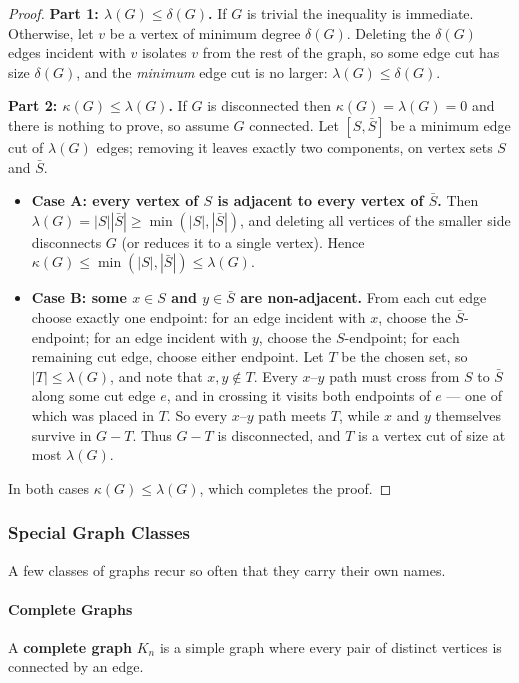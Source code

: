 \begin{proof}
\textbf{Part 1: $\lambda(G) \le \delta(G)$.}
If $G$ is trivial the inequality is immediate. Otherwise, let $v$ be a vertex of minimum degree $\delta(G)$. Deleting the $\delta(G)$ edges incident with $v$ isolates $v$ from the rest of the graph, so some edge cut has size $\delta(G)$, and the \textit{minimum} edge cut is no larger: $\lambda(G) \le \delta(G)$.

\textbf{Part 2: $\kappa(G) \le \lambda(G)$.}
If $G$ is disconnected then $\kappa(G) = \lambda(G) = 0$ and there is nothing to prove, so assume $G$ connected. Let $[S, \bar{S}]$ be a minimum edge cut of $\lambda(G)$ edges; removing it leaves exactly two components, on vertex sets $S$ and $\bar{S}$.
\begin{itemize}
    \item \textbf{Case A: every vertex of $S$ is adjacent to every vertex of $\bar{S}$.}
    Then $\lambda(G) = |S||\bar{S}| \ge \min(|S|, |\bar{S}|)$, and deleting all vertices of the smaller side disconnects $G$ (or reduces it to a single vertex). Hence $\kappa(G) \le \min(|S|, |\bar{S}|) \le \lambda(G)$.
    \item \textbf{Case B: some $x \in S$ and $y \in \bar{S}$ are non-adjacent.}
    From each cut edge choose exactly one endpoint: for an edge incident with $x$, choose the $\bar{S}$-endpoint; for an edge incident with $y$, choose the $S$-endpoint; for each remaining cut edge, choose either endpoint. Let $T$ be the chosen set, so $|T| \le \lambda(G)$, and note that $x, y \notin T$.
    Every $x$--$y$ path must cross from $S$ to $\bar{S}$ along some cut edge $e$, and in crossing it visits both endpoints of $e$ — one of which was placed in $T$. So every $x$--$y$ path meets $T$, while $x$ and $y$ themselves survive in $G - T$. Thus $G - T$ is disconnected, and $T$ is a vertex cut of size at most $\lambda(G)$.
\end{itemize}
In both cases $\kappa(G) \le \lambda(G)$, which completes the proof.
\end{proof}

\subsubsection{Special Graph Classes}

A few classes of graphs recur so often that they carry their own names.

\paragraph{Complete Graphs}
\begin{definition}
A \textbf{complete graph} $K_n$ is a simple graph where every pair of distinct vertices is connected by an edge.
\end{definition}

